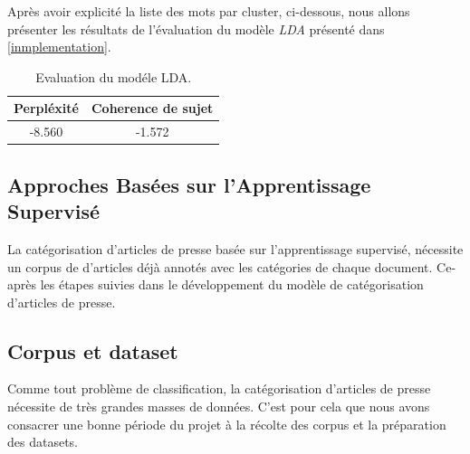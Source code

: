     Après avoir explicité la liste des mots par cluster, ci-dessous, nous allons présenter les résultats de l'évaluation du modèle \emph{LDA} présenté dans \ref{inmplementation}.
    \begin{table}[H]
        \begin{center}
            \begin{tabular}{|c|c|}
                \hline
                \textbf{Perpléxité} & \textbf{Coherence de sujet} \\
                \hline
                -8.560 &-1.572  \\
                \hline
            \end{tabular}
        \end{center}
        \caption{Evaluation du modéle LDA.}
        \label{Eval LDA}
    \end{table}


\subsection{Approches Basées sur l'Apprentissage Supervisé}
La catégorisation d'articles de presse basée sur l'apprentissage supervisé, nécessite un corpus de d'articles déjà annotés avec les catégories de chaque document. Ce-après les étapes suivies dans le développement du modèle de catégorisation d'articles de presse.
\subsection{Corpus et dataset}
Comme tout problème de classification, la catégorisation d'articles de presse nécessite de très grandes masses de données. C'est pour cela que nous avons consacrer une bonne période du projet à la récolte des corpus et la préparation des datasets.     
